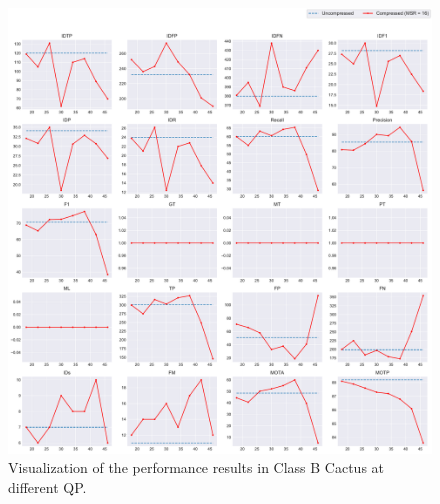 \begin{figure}[!htbp]
  \centering
  \includegraphics[width=1.0\linewidth]{img/Cactus_58_multiplots_qp.pdf}
  \caption[Visualization of the performance results in Class B Cactus at different QP]
  {
     Visualization of the performance results in Class B Cactus at different QP.
  }
  \label{fig:Cactus_58_multiplots_qp}
\end{figure}